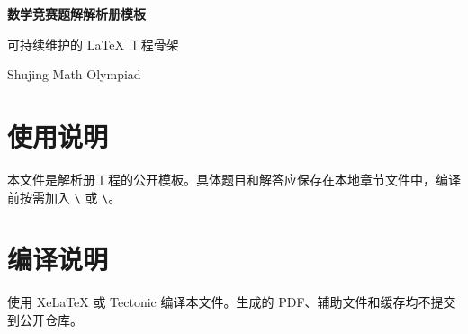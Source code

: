 \documentclass[UTF8,12pt,openany]{ctexbook}
\begin{document}
\frontmatter
\begin{titlepage}
\centering
\vspace*{3cm}
{\Huge\bfseries 数学竞赛题解解析册模板\par}
\vspace{1cm}
{\LARGE 可持续维护的 LaTeX 工程骨架\par}
\vfill
{\large Shujing Math Olympiad\par}
\end{titlepage}

\tableofcontents

\mainmatter
\chapter{使用说明}
本文件是解析册工程的公开模板。具体题目和解答应保存在本地章节文件中，编译前按需加入
\verb|\| 或 \verb|\|。

\backmatter
\chapter{编译说明}
使用 XeLaTeX 或 Tectonic 编译本文件。生成的 PDF、辅助文件和缓存均不提交到公开仓库。
\end{document}
